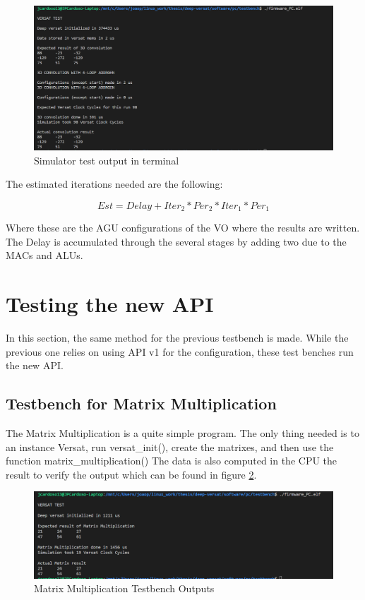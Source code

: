 \begin{figure}[!htbp]
    \centering
    \includegraphics[width=\textwidth]{Figures/test1.png}
    \caption{Simulator test output in terminal}
    \label{figure:test1}
\end{figure} 

The estimated iterations needed are the following:

\[ Est=Delay+Iter_2*Per_2*Iter_1*Per_1\]

Where these are the AGU configurations of the VO where the results are written. The Delay is accumulated
through the several stages by adding two due to the MACs and ALUs.

\section{Testing the new API}
\label{section:testgencov}

In this section, the same method for the previous testbench is made. 
While the previous one relies on using API v1 for the configuration, these test benches
run the new API. 

\subsection{Testbench for Matrix Multiplication}

The Matrix Multiplication is a quite simple program. The only thing needed is to an instance
Versat, run versat\_init(), create the matrixes, and then use the function matrix\_multiplication()
The data is also computed in the CPU the result to verify the output which can be found in
figure \ref{figure:test2}.

\begin{figure}[!htbp]
    \centering
    \includegraphics[width=\textwidth]{Figures/test2.png}
    \caption{Matrix Multiplication Testbench Outputs}
    \label{figure:test2}
\end{figure}


